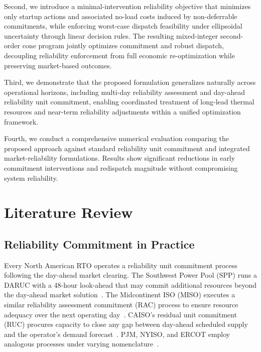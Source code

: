 \documentclass[journal]{IEEEtran}
\begin{document}
Second, we introduce a minimal-intervention reliability objective that
minimizes only startup actions and associated no-load costs induced by
non-deferrable commitments, while enforcing worst-case dispatch
feasibility under ellipsoidal uncertainty through linear decision rules.
The resulting mixed-integer second-order cone program jointly optimizes
commitment and robust dispatch, decoupling reliability enforcement from
full economic re-optimization while preserving market-based outcomes.

Third, we demonstrate that the proposed formulation generalizes
naturally across operational horizons, including multi-day reliability
assessment and day-ahead reliability unit commitment, enabling
coordinated treatment of long-lead thermal resources and near-term
reliability adjustments within a unified optimization framework.

Fourth, we conduct a comprehensive numerical evaluation comparing the
proposed approach against standard reliability unit commitment and
integrated market-reliability formulations. Results show significant
reductions in early commitment interventions and redispatch magnitude
without compromising system reliability.


\section{Literature Review}

\subsection{Reliability Commitment in Practice}

Every North American RTO operates a reliability unit commitment
process following the day-ahead market clearing.
The Southwest Power Pool (SPP) runs a DARUC with a 48-hour
look-ahead that may commit additional resources beyond the
day-ahead market solution~\cite{spp2024protocols}.
The Midcontinent ISO (MISO) executes a similar reliability
assessment commitment (RAC) process to ensure resource adequacy
over the next operating day~\cite{miso2024bpm002}.
CAISO's residual unit commitment (RUC) procures capacity to
close any gap between day-ahead scheduled supply and the
operator's demand forecast~\cite{caiso2024ruc}.
PJM, NYISO, and ERCOT employ analogous processes under varying
nomenclature~\cite{pjm2024manual11, nyiso2024oatt, ercot2024protocols}.
\end{document}
